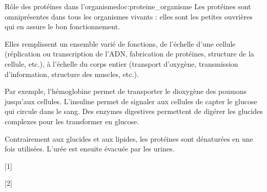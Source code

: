 \begin{doc}{Rôle des protéines dans l'organisme}{doc:proteine_organisme}
  Les protéines sont omniprésentes dans tous les organismes vivants : elles sont les petites ouvrières qui en assure le bon fonctionnement.
  
  Elles remplissent un ensemble varié de fonctions, de l'échelle d'une cellule (réplication ou transcription de l'ADN, fabrication de protéines, structure de la cellule, etc.), à l'échelle du corps entier (transport d'oxygène, transmission d'information, structure des muscles, etc.).

  Par exemple, l'hémoglobine permet de transporter le dioxygène des poumons jusqu'aux cellules.
  L'insuline permet de signaler aux cellules de capter le glucose qui circule dans le sang.
  Des enzymes digestives permettent de digérer les glucides complexes pour les transformer en glucose.

  Contrairement aux glucides et aux lipides, les protéines sont dénaturées en  une fois utilisées.
  L'urée est ensuite évacuée par les urines.
\end{doc}

[1]

[2]
